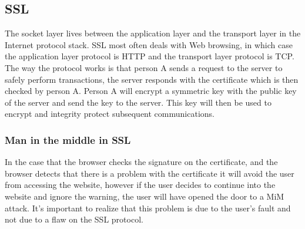 \documentclass{article}
\begin{document}
\subsection{SSL}
The socket layer lives between the application layer and the transport layer in the Internet protocol stack. SSL most often deals with Web browsing, in which case the application layer protocol is HTTP and the transport layer protocol is TCP.\\
The way the protocol works is that person A sends a request to the server to safely perform transactions, the server responds with the certificate which is then checked by person A. Person A will encrypt a symmetric key with the public key of the server and send the key to the server. This key will then be used to encrypt and integrity protect subsequent communications.

\subsubsection{Man in the middle in SSL}
In the case that the browser checks the signature on the certificate, and the browser detects that there is a problem with the certificate it will avoid the user from accessing the website, however if the user decides to continue into the website and ignore the warning, the user will have opened the door to a MiM attack. It's important to realize that this problem is due to the user's fault and not due to a flaw on the SSL protocol.
\end{document}
